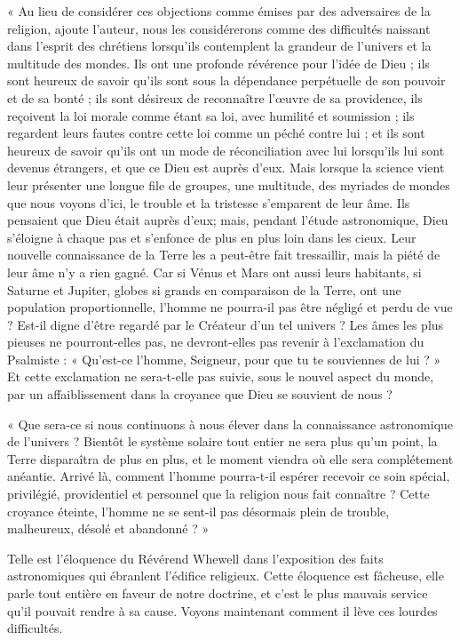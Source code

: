 \documentclass[a4paper, 11pt, oneside, landscape]{article}
\begin{document}
« Au lieu de considérer ces objections comme émises par des adversaires de la religion, ajoute l'auteur, nous les considérerons comme des difficultés naissant dans l'esprit des chrétiens lorsqu'ils contemplent la grandeur de l'univers et la multitude des mondes. Ils ont une profonde révérence pour l'idée de Dieu ; ils sont heureux de savoir qu'ils sont sous la dépendance perpétuelle de son pouvoir et de sa bonté ; ils sont désireux de reconnaître l'œuvre de sa providence, ils reçoivent la loi morale comme étant sa loi, avec humilité et soumission ; ils regardent leurs fautes contre cette loi comme un péché contre lui ; et ils sont heureux de savoir qu'ils ont un mode de réconciliation avec lui lorsqu'ils lui sont devenus étrangers, et que ce Dieu est auprès d'eux. Mais lorsque la science vient leur présenter une longue file de groupes, une multitude, des myriades de mondes que nous voyons d'ici, le trouble et la tristesse s'emparent de leur âme. Ils pensaient que Dieu était auprès d'eux; mais, pendant l'étude astronomique, Dieu s'éloigne à chaque pas et s'enfonce de plus en plus loin dans les cieux. Leur nouvelle connaissance de la Terre les a peut-être fait tressaillir, mais la piété de leur âme n'y a rien gagné. Car si Vénus et Mars ont aussi leurs habitants, si Saturne et Jupiter, globes si grands en comparaison de la Terre, ont une population proportionnelle, l'homme ne pourra-il pas être négligé et perdu de vue ? Est-il digne d'être regardé par le Créateur d'un tel univers ? Les âmes les plus pieuses ne pourront-elles pas, ne devront-elles pas revenir à l'exclamation du Psalmiste : « Qu'est-ce l'homme, Seigneur, pour que tu te souviennes de lui ? » Et cette exclamation ne sera-t-elle pas suivie, sous le nouvel aspect du monde, par un affaiblissement dans la croyance que Dieu se souvient de nous ?

« Que sera-ce si nous continuons à nous élever dans la connaissance astronomique de l'univers ? Bientôt le système solaire tout entier ne sera plus qu'un point, la Terre disparaîtra de plus en plus, et le moment viendra où elle sera complétement anéantie. Arrivé là, comment l'homme pourra-t-il espérer recevoir ce soin spécial, privilégié, providentiel et personnel que la religion nous fait connaître ? Cette croyance éteinte, l'homme ne se sent-il pas désormais plein de trouble, malheureux, désolé et abandonné ? »

Telle est l'éloquence du Révérend Whewell dans l'exposition des faits astronomiques qui ébranlent l'édifice religieux. Cette éloquence est fâcheuse, elle parle tout entière en faveur de notre doctrine, et c'est le plus mauvais service qu'il pouvait rendre à sa cause. Voyons maintenant comment il lève ces lourdes difficultés.
\end{document}
